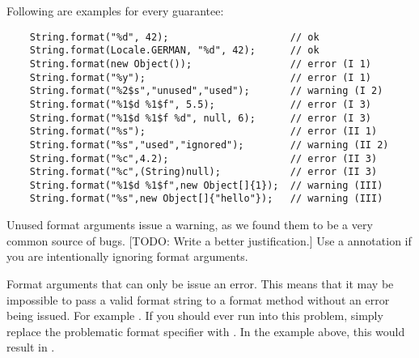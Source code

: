 \noindent Following are examples for every guarantee:

\begin{Verbatim}
    String.format("%d", 42);                     // ok
    String.format(Locale.GERMAN, "%d", 42);      // ok
    String.format(new Object());                 // error (I 1)
    String.format("%y");                         // error (I 1)
    String.format("%2$s","unused","used");       // warning (I 2)
    String.format("%1$d %1$f", 5.5);             // error (I 3)
    String.format("%1$d %1$f %d", null, 6);      // error (I 3)
    String.format("%s");                         // error (II 1)
    String.format("%s","used","ignored");        // warning (II 2)
    String.format("%c",4.2);                     // error (II 3)
    String.format("%c",(String)null);            // error (II 3)
    String.format("%1$d %1$f",new Object[]{1});  // warning (III)
    String.format("%s",new Object[]{"hello"});   // warning (III)
\end{Verbatim}

Unused format arguments issue a warning, as we found them to be a very common source of bugs.
[TODO: Write a better justification.]
Use a  annotation if you are intentionally ignoring format arguments.

Format arguments that can only be  issue an error. This means that it
may be impossible to pass a valid format string to a format method without an
error being issued. For example . 
If you should ever run into this problem, simply replace the problematic format 
specifier with . In the example above, this would result in
.


